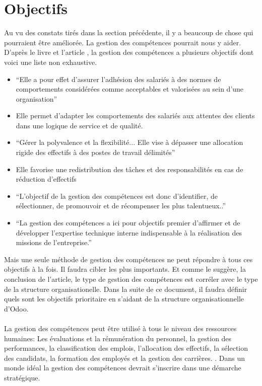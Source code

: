 \section{Objectifs}
Au vu des constats tirés dans la section précédente, il y a beaucoup de chose qui pourraient être améliorée. La gestion des compétences pourrait nous y aider. D'après le livre\citep{gestionressourceshumaine2007} et l'article \citep{delobbe}, la gestion des compétences a plusieurs objectifs dont voici une liste non exhaustive.
\begin{itemize}
    \item \enquote{Elle a pour effet d'assurer l'adhésion des salariés à des normes de comportements considérées comme acceptables et valorisées au sein d'une organisation}\citep[p.40]{delobbe}
    \item Elle permet d'adapter les comportements des salariés aux attentes des clients dans une logique de service et de qualité. \citep[182]{gestionressourceshumaine2007}
    \item \enquote{Gérer la polyvalence et la flexibilité... Elle vise à dépasser une allocation rigide des effectifs à des postes de travail délimités}\citep[p.41]{delobbe}
    \item Elle favorise une redistribution des tâches et des responsabilités en cas de réduction d'effectifs \citep[182]{gestionressourceshumaine2007}
    \item  \enquote{L'objectif de la gestion des compétences est donc d'identifier, de sélectionner, de promouvoir et de récompenser les plus talentueux..}\citep[p.43]{delobbe}
    \item  \enquote{La gestion des compétences a ici pour objectifs premier d'affirmer et de développer l'expertise technique interne indispensable à la réalisation des missions de l'entreprise.} \citep[p.45]{delobbe}

\end{itemize}
           
Mais une seule méthode de gestion des compétences ne peut répondre à tous ces objectifs à la fois. Il faudra cibler les  plus importants. Et comme le suggère, la conclusion de l'article\citep{delobbe}, le type de gestion des compétences est corréler avec le type de la structure organisationelle. Dans la suite de ce document, il faudra définir quels sont les objectifs prioritaire en s'aidant de la structure organisationnelle d'Odoo. 

\paragraph{}La gestion des compétences peut être utilisé à tous le niveau des ressources humaines: Les évaluations et la rémunération du personnel, la gestion des performances, la classification des emplois, l'allocation des effectifs, la sélection des candidats, la formation des employés et la gestion des carrières. \citep[p.32]{delobbe}. Dans un monde idéal la gestion des compétences devrait s'inscrire dans une démarche stratégique. 

